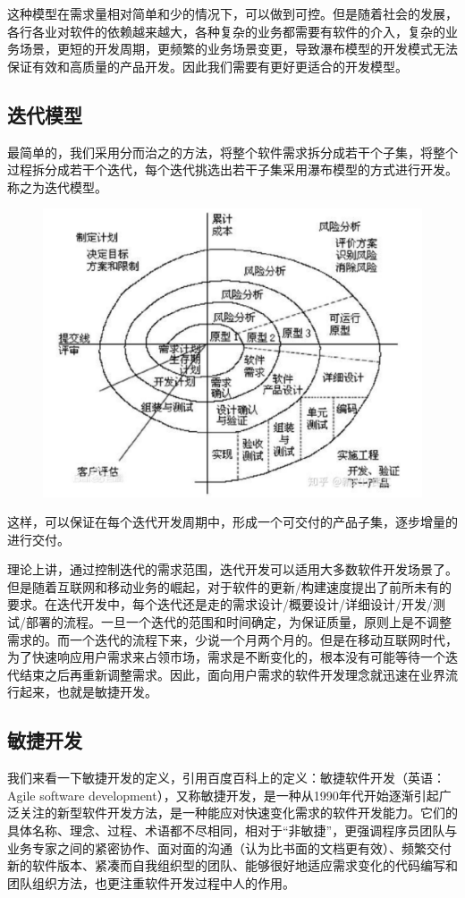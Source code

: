 \documentclass[12pt]{article}
\begin{document}
这种模型在需求量相对简单和少的情况下，可以做到可控。但是随着社会的发展，各行各业对软件的依赖越来越大，各种复杂的业务都需要有软件的介入，复杂的业务场景，更短的开发周期，更频繁的业务场景变更，导致瀑布模型的开发模式无法保证有效和高质量的产品开发。因此我们需要有更好更适合的开发模型。

\subsection{迭代模型}
最简单的，我们采用分而治之的方法，将整个软件需求拆分成若干个子集，将整个过程拆分成若干个迭代，每个迭代挑选出若干子集采用瀑布模型的方式进行开发。称之为迭代模型。
\begin{figure}[H]
    \centering
    \includegraphics[width=.6\textwidth]{fig/DevOps_Iteration.png}
\end{figure}

这样，可以保证在每个迭代开发周期中，形成一个可交付的产品子集，逐步增量的进行交付。

理论上讲，通过控制迭代的需求范围，迭代开发可以适用大多数软件开发场景了。但是随着互联网和移动业务的崛起，对于软件的更新/构建速度提出了前所未有的要求。在迭代开发中，每个迭代还是走的需求设计/概要设计/详细设计/开发/测试/部署的流程。一旦一个迭代的范围和时间确定，为保证质量，原则上是不调整需求的。而一个迭代的流程下来，少说一个月两个月的。但是在移动互联网时代，为了快速响应用户需求来占领市场，需求是不断变化的，根本没有可能等待一个迭代结束之后再重新调整需求。因此，面向用户需求的软件开发理念就迅速在业界流行起来，也就是敏捷开发。

\subsection{敏捷开发}
我们来看一下敏捷开发的定义，引用百度百科上的定义：敏捷软件开发（英语：Agile software development），又称敏捷开发，是一种从1990年代开始逐渐引起广泛关注的新型软件开发方法，是一种能应对快速变化需求的软件开发能力。它们的具体名称、理念、过程、术语都不尽相同，相对于“非敏捷”，更强调程序员团队与业务专家之间的紧密协作、面对面的沟通（认为比书面的文档更有效）、频繁交付新的软件版本、紧凑而自我组织型的团队、能够很好地适应需求变化的代码编写和团队组织方法，也更注重软件开发过程中人的作用。
\end{document}
